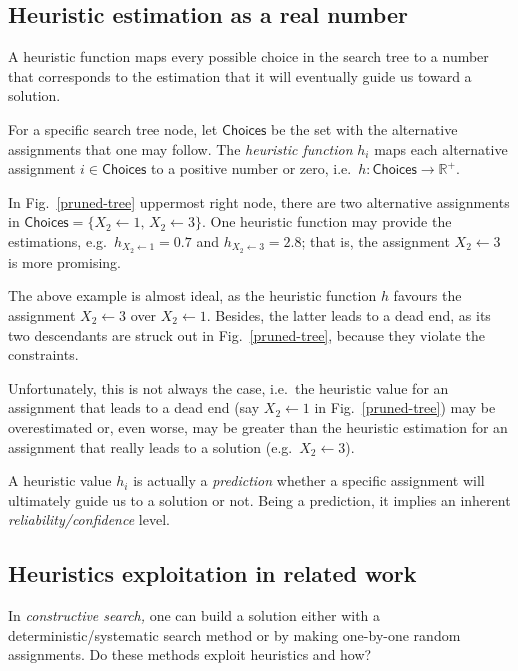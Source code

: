 \documentclass{ws-ijait}
\begin{document}
\subsection{Heuristic estimation as a real number}

A heuristic function maps every possible choice in the
search tree to a number that corresponds to the estimation
that it will eventually guide us toward a solution.
\begin{definition}
  For a specific search tree node, let $\mathsf{Choices}$ be
  the set with the alternative assignments that one may
  follow. The \emph{heuristic function} $h_i$ maps each
  alternative assignment $i \in \mathsf{Choices}$ to a
  positive number or zero, i.e.\ $h: \mathsf{Choices} \to
  \mathbb{R}^+$.
\end{definition}
\begin{example}
  In Fig.~\ref{pruned-tree} uppermost right node, there are
  two alternative assignments in $\mathsf{Choices} = \{ X_2
  \gets 1, \, X_2 \gets 3 \}$. One heuristic function may
  provide the estimations, e.g.\ $h_{X_2 \gets 1} = 0.7$ and
  $h_{X_2 \gets 3} = 2.8$; that is, the assignment $X_2
  \gets 3$ is more promising.
\end{example}
The above example is almost ideal, as the heuristic function
$h$ favours the assignment $X_2 \gets 3$ over $X_2 \gets 1$.
Besides, the latter leads to a dead end, as its two
descendants are struck out in Fig.~\ref{pruned-tree},
because they violate the constraints.

Unfortunately, this is not always the case, i.e.\ the
heuristic value for an assignment that leads to a dead end
(say $X_2 \gets 1$ in Fig.~\ref{pruned-tree}) may be
overestimated or, even worse, may be greater than the
heuristic estimation for an assignment that really leads to
a solution (e.g.\ $X_2 \gets 3$).

A heuristic value $h_i$ is actually a \emph{prediction}
whether a specific assignment will ultimately guide us to a
solution or not. Being a prediction, it implies an inherent
\emph{reliability\slash confidence} level.

\subsection{Heuristics exploitation in related work}

In \emph{constructive search,} one can build a solution
either with a deterministic\slash systematic search method
or by making one-by-one random assignments. Do these methods
exploit heuristics and how?
\end{document}
